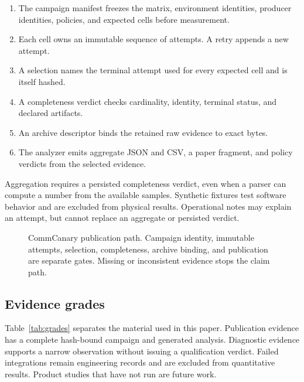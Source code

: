 \documentclass[10pt,twocolumn]{article}
\begin{document}
\begin{enumerate}
  \item The campaign manifest freezes the matrix, environment identities,
    producer identities, policies, and expected cells before measurement.
  \item Each cell owns an immutable sequence of attempts. A retry appends a new
    attempt.
  \item A selection names the terminal attempt used for every expected cell
    and is itself hashed.
  \item A completeness verdict checks cardinality, identity, terminal status,
    and declared artifacts.
  \item An archive descriptor binds the retained raw evidence to exact bytes.
  \item The analyzer emits aggregate JSON and CSV, a paper fragment, and policy
    verdicts from the selected evidence.
\end{enumerate}

Aggregation requires a persisted completeness verdict, even when a parser can
compute a number from the available samples. Synthetic fixtures test software
behavior and are excluded from physical results. Operational notes may explain
an attempt, but cannot replace an aggregate or persisted verdict.

\begin{figure}[t]
  \centering
  
  \caption{CommCanary publication path. Campaign identity, immutable attempts,
  selection, completeness, archive binding, and publication are separate
  gates. Missing or inconsistent evidence stops the claim path.}
  \label{fig:path}
\end{figure}

\subsection{Evidence grades}

Table~\ref{tab:grades} separates the material used in this paper. Publication
evidence has a complete hash-bound campaign and generated analysis. Diagnostic
evidence supports a narrow observation without issuing a qualification verdict.
Failed integrations remain engineering records and are excluded from
quantitative results. Product studies that have not run are future work.
\end{document}
